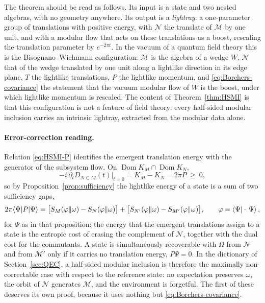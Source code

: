 \documentclass[a4paper,11pt]{article}
\theoremstyle{definition}
\begin{document}
The theorem should be read as follows. Its input is a state and two nested algebras, with no geometry anywhere. Its output is a \emph{lightray}: a one-parameter group of translations with positive energy, with $\mathcal N$ the translate of $\mathcal M$ by one unit, and with a modular flow that acts on these translations as a boost, rescaling the translation parameter by $e^{-2\pi t}$. In the vacuum of a quantum field theory this is the Bisognano--Wichmann configuration: $\mathcal M$ is the algebra of a wedge $W$, $\mathcal N$ that of the wedge translated by one unit along a lightlike direction in its edge plane, $T$ the lightlike translations, $P$ the lightlike momentum, and \eqref{eq:Borchers-covariance} the statement that the vacuum modular flow of $W$ is the boost, under which lightlike momentum is rescaled. The content of Theorem~\ref{thm:HSMI} is that this configuration is not a feature of field theory: every half-sided modular inclusion carries an intrinsic lightray, extracted from the modular data alone.

\paragraph{Error-correction reading.}
Relation \eqref{eq:HSMI-P} identifies the emergent translation energy with the generator of the subsystem flow. On $\operatorname{Dom}K_M\cap\operatorname{Dom}K_N$,
\begin{equation}
 -i\,\partial_t D_{N\subset M}(t)\big|_{t=0}=K_M-K_N=2\pi P\ \ge\ 0 ,
 \label{eq:HSMI-generator}
\end{equation}
so by Proposition~\ref{prop:sufficiency} the lightlike energy of a state is a sum of two sufficiency gaps,
\begin{equation}
 2\pi\langle\Psi|P|\Psi\rangle
 =\bigl[S_M(\varphi\|\omega)-S_N(\varphi\|\omega)\bigr]
 +\bigl[S_{N'}(\varphi\|\omega)-S_{M'}(\varphi\|\omega)\bigr],
 \qquad \varphi=\braket{\Psi|\cdot\,\Psi},
 \label{eq:HSMI-energy-gaps}
\end{equation}
for $\Psi$ as in that proposition: the energy that the emergent translations assign to a state is the entropic cost of erasing the complement of $\mathcal N$, together with the dual cost for the commutants. A state is simultaneously recoverable with $\Omega$ from $\mathcal N$ and from $\mathcal M'$ only if it carries no translation energy, $P\Psi=0$. In the dictionary of Section~\ref{sec:QEC}, a half-sided modular inclusion is therefore the maximally non-correctable case with respect to the reference state: no expectation preserves $\omega$, the orbit of $\mathcal N$ generates $\mathcal M$, and the environment is forgetful. The first of these deserves its own proof, because it uses nothing but \eqref{eq:Borchers-covariance}.
\end{document}
